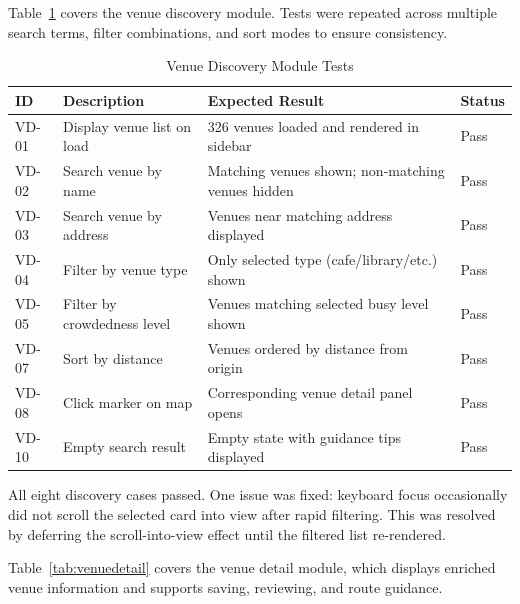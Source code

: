 \documentclass[conference]{IEEEtran}
\begin{document}
Table~\ref{tab:venuediscovery} covers the venue discovery module. Tests were repeated across multiple search terms, filter combinations, and sort modes to ensure consistency.

\begin{table}[htbp]
\caption{Venue Discovery Module Tests}
\label{tab:venuediscovery}
\begin{center}
\scriptsize
\setlength{\tabcolsep}{1pt}
\begin{tabular}{@{}|p{}|p{}|p{}|p{}|@{}}
\hline
\textbf{ID} & \textbf{Description} & \textbf{Expected Result} & \textbf{Status} \\
\hline
VD-01 & Display venue list on load & 326 venues loaded and rendered in sidebar & Pass \\
\hline
VD-02 & Search venue by name & Matching venues shown; non-matching venues hidden & Pass \\
\hline
VD-03 & Search venue by address & Venues near matching address displayed & Pass \\
\hline
VD-04 & Filter by venue type & Only selected type (cafe/library/etc.) shown & Pass \\
\hline
VD-05 & Filter by crowdedness level & Venues matching selected busy level shown & Pass \\
\hline
VD-07 & Sort by distance & Venues ordered by distance from origin & Pass \\
\hline
VD-08 & Click marker on map & Corresponding venue detail panel opens & Pass \\
\hline
VD-10 & Empty search result & Empty state with guidance tips displayed & Pass \\
\hline
\end{tabular}
\end{center}
\end{table}

All eight discovery cases passed. One issue was fixed: keyboard focus occasionally did not scroll the selected card into view after rapid filtering. This was resolved by deferring the scroll-into-view effect until the filtered list re-rendered.

Table~\ref{tab:venuedetail} covers the venue detail module, which displays enriched venue information and supports saving, reviewing, and route guidance.
\end{document}

